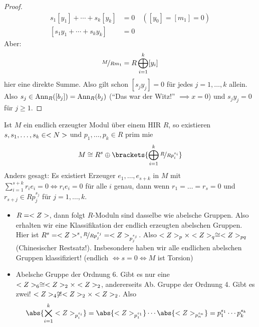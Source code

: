 \begin{proof}
	\begin{align*}
	s_1[y_1] + \cdots + s_k [y_k] &= 0 \quad ([y_0] = [m_1] = 0)\\
	[s_1 y_1 + \cdots + s_k y_k] &= 0
	\end{align*}
	Aber:
	\begin{align*}
	\lnkset{M}{R m_1} = R\bigoplus_{i=1}^k [y_i]
	\end{align*}
	hier eine direkte Summe. Also gilt schon $[s_j y_j] = 0$ für jedes $j = 1, \dots, k$ allein. Also $s_j \in \operatorname{Ann}_R([b_j]) = \operatorname{Ann}_R(b_j)$ (``Das war der Witz!'' $\implies x = 0$) und $s_j y_j = 0$ für $j \ge 1$.
\end{proof}
\begin{proposition}
	Ist $M$ ein endlich erzeugter Modul über einem HIR $R$, so existieren $s, s_1, \dots, s_k \in <N>$ und $p_1, \dots, p_k \in R$ prim mie 
	\begin{align*}
	M \cong R^s \oplus \brackets{\bigoplus_{i=1}^k \lnkset{R}{Rp_i^{s_i}}}
	\end{align*}
	Anders gesagt: Es existiert Erzeuger $e_1, \dots, e_{s+k}$ in $M$ mit $\sum_{i=1}^{s+k} r_i e_i = 0 \Leftrightarrow r_i e_i = 0$ für alle $i$ genau, dann wenn $r_1 = \dots = r_s = 0$ und $r_{s+j} \in Rp_j^{s_j}$ für $j = 1, \dots, k$. 
\end{proposition}
\begin{example}
	\begin{itemize}
		\item $R = <Z>$, dann folgt $R$-Moduln sind dasselbe wie abelsche Gruppen. Also erhalten wir eine Klassifikation der endlich erzeugten abelschen Gruppen. Hier ist $R^s = \Z^s, \lnkset{R}{Rp_j^{s_j}} = \Z_{p_j^{s_j}}$. Also $<Z>_p \times <Z>_q \cong <Z>_{pq}$ (Chinesischer Restsatz!). Insbesondere haben wir alle endlichen abelschen Gruppen klassifiziert! (endlich $\Leftrightarrow s = 0 \Leftrightarrow M$ ist Torsion)
		\item Abelsche Gruppe der Ordnung 6. Gibt es nur eine $<Z>_6 \cong <Z>_2 \times <Z>_2$, andererseits Ab. Gruppe der Ordnung 4. Gibt es zwei! $<Z>_4 \not\cong <Z>_2 \times <Z>_2$. Also
		\begin{align*}
		\abs{\bigtimes_{i=1}^k\Z_{p_i^{s_i}}} = \abs{\Z_{p_1^{s_1}}} \cdots \abs{\Z_{p_n^{s_n}}} = p_1^{s_1} \cdots p_k^{s_k}
		\end{align*}
	\end{itemize}
\end{example}
